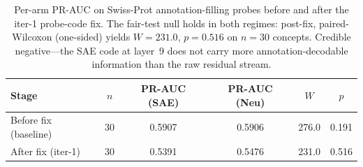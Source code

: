 \begin{table}[t]
\centering
\caption{Per-arm PR-AUC on Swiss-Prot annotation-filling probes before and after the iter-1 probe-code fix. The fair-test null holds in both regimes: post-fix, paired-Wilcoxon (one-sided) yields $W=231.0$, $p=0.516$ on $n=30$ concepts. Credible negative---the SAE code at layer~9 does not carry more annotation-decodable information than the raw residual stream.}
\label{tab:c5a_before_after}
\begin{tabular}{lccccc}
\toprule
Stage & $n$ & PR-AUC (SAE) & PR-AUC (Neu) & $W$ & $p$ \\
\midrule
Before fix (baseline)  & 30  & 0.5907 & 0.5906 & 276.0 & 0.191 \\
After fix (iter-1)     & 30 & 0.5391 & 0.5476 & 231.0 & 0.516 \\
\bottomrule
\end{tabular}
\end{table}
